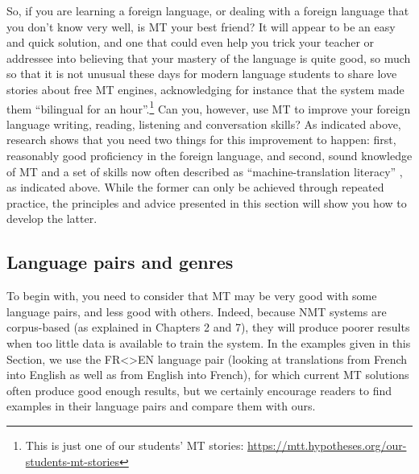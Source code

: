 \documentclass[output=paper,colorlinks,citecolor=brown,
]{langscibook}
\begin{document}
So, if you are learning a foreign language, or dealing with a foreign language that you don’t know very well, is MT your best friend? It will appear to be an easy and quick solution, and one that could even help you trick your teacher or addressee into believing that your mastery of the language is quite good, so much so that it is not unusual these days for modern language students to share love stories about free MT engines, acknowledging for instance that the system made them “bilingual for an hour”.\footnote{This is just one of our students’ MT stories: \url{https://mtt.hypotheses.org/our-students-mt-stories}}  Can you, however, use MT to improve your foreign language writing, reading, listening and conversation skills? As indicated above, research shows that you need two things for this improvement to happen: first, reasonably good proficiency in the foreign language, and second, sound knowledge of MT and a set of skills now often described as “machine-translation literacy” \citep{BowkerCiro2019}, as indicated above. While the former can only be achieved through repeated practice, the principles and advice presented in this section will show you how to develop the latter.

\subsection{Language pairs and genres} 

To begin with, you need to consider that MT may be very good with some language pairs, and less good with others. Indeed, because NMT systems are corpus-based (as explained in Chapters 2 and 7), they will produce poorer results when too little data is available to train the system. In the examples given in this Section, we use the FR<>EN language pair (looking at translations from French into English as well as from English into French), for which current MT solutions often produce good enough results, but we certainly encourage readers to find examples in their language pairs and compare them with ours. 
\end{document}
